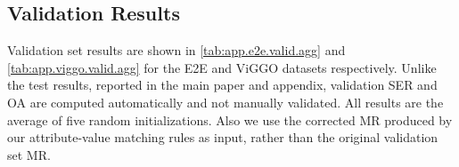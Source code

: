\subsection{Validation Results}

Validation set results are shown in \autoref{tab:app.e2e.valid.agg} and 
    \autoref{tab:app.viggo.valid.agg}
for the E2E and ViGGO datasets respectively. Unlike the test results, reported in the main paper and appendix, validation SER and OA are computed automatically and not manually validated. All results are the average of five random
initializations. Also we use the corrected MR produced by our attribute-value
matching rules as input, rather than the original validation set MR.




